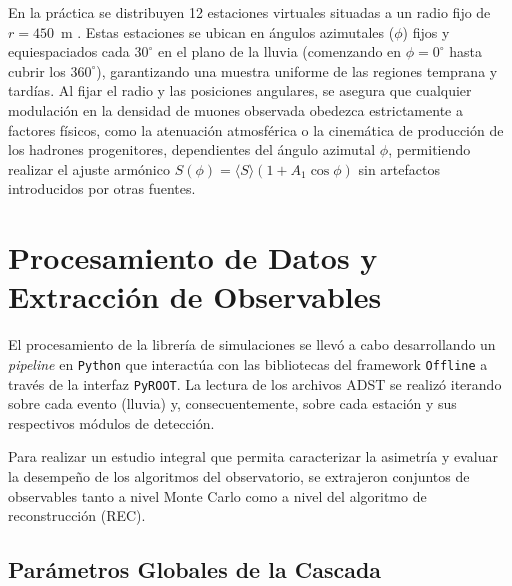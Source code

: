En la práctica se distribuyen 12 estaciones virtuales situadas a un radio fijo de $r = 450$~m \cite{auger2021infill}. Estas estaciones se ubican en ángulos azimutales ($\phi$) fijos y equiespaciados cada $30^\circ$ en el plano de la lluvia (comenzando en $\phi = 0^\circ$ hasta cubrir los $360^\circ$), garantizando una muestra uniforme de las regiones temprana y tardías. Al fijar el radio y las posiciones angulares, se asegura que cualquier modulación en la densidad de muones observada obedezca estrictamente a factores físicos, como la atenuación atmosférica o la cinemática de producción de los hadrones progenitores, dependientes del ángulo azimutal $\phi$, permitiendo realizar el ajuste armónico $S(\phi) = \langle S \rangle (1 + A_1 \cos\phi)$ sin artefactos introducidos por otras fuentes.

\section{Procesamiento de Datos y Extracción de Observables}
\label{sec:procesamiento_datos}

El procesamiento de la librería de simulaciones se llevó a cabo desarrollando un \textit{pipeline} en \texttt{Python} que interactúa con las bibliotecas del framework \texttt{Offline} a través de la interfaz \texttt{PyROOT}. La lectura de los archivos ADST se realizó iterando sobre cada evento (lluvia) y, consecuentemente, sobre cada estación y sus respectivos módulos de detección.

\vspace{2cm}

Para realizar un estudio integral que permita caracterizar la asimetría y evaluar la desempeño de los algoritmos del observatorio, se extrajeron conjuntos de observables tanto a nivel Monte Carlo como a nivel del algoritmo de reconstrucción (REC). 

\subsection{Parámetros Globales de la Cascada}

